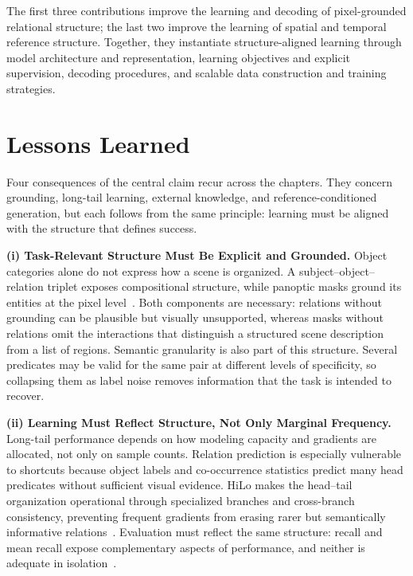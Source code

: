 \noindent The first three contributions improve the learning and decoding of pixel-grounded relational structure; the last two improve the learning of spatial and temporal reference structure. Together, they instantiate structure-aligned learning through model architecture and representation, learning objectives and explicit supervision, decoding procedures, and scalable data construction and training strategies.

\section{Lessons Learned}
Four consequences of the central claim recur across the chapters. They concern grounding, long-tail learning, external knowledge, and reference-conditioned generation, but each follows from the same principle: learning must be aligned with the structure that defines success.

\noindent \textbf{(i) Task-Relevant Structure Must Be Explicit and Grounded.}
Object categories alone do not express how a scene is organized. A subject--object--relation triplet exposes compositional structure, while panoptic masks ground its entities at the pixel level~\citep{cheng2022visual, zhou2023hilo}. Both components are necessary: relations without grounding can be plausible but visually unsupported, whereas masks without relations omit the interactions that distinguish a structured scene description from a list of regions. Semantic granularity is also part of this structure. Several predicates may be valid for the same pair at different levels of specificity, so collapsing them as label noise removes information that the task is intended to recover.

\noindent \textbf{(ii) Learning Must Reflect Structure, Not Only Marginal Frequency.}
Long-tail performance depends on how modeling capacity and gradients are allocated, not only on sample counts. Relation prediction is especially vulnerable to shortcuts because object labels and co-occurrence statistics predict many head predicates without sufficient visual evidence. HiLo makes the head--tail organization operational through specialized branches and cross-branch consistency, preventing frequent gradients from erasing rarer but semantically informative relations~\citep{tang2020unbiased, zellers2018neural, zhou2023hilo}. Evaluation must reflect the same structure: recall and mean recall expose complementary aspects of performance, and neither is adequate in isolation~\citep{zellers2018neural}.

